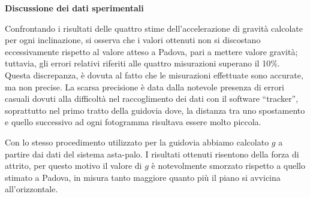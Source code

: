 \documentclass[a4paper,11pt,titlepage]{book}
\begin{document}
\newpage
\begin{center}
\begin{large}
\textbf{Discussione dei dati sperimentali}
\end{large}
\end{center}

\vspace{0.15cm}

\begin{flushleft}
Confrontando i risultati delle quattro stime dell’accelerazione di gravità calcolate per ogni inclinazione, si osserva che i valori ottenuti non si discostano eccessivamente rispetto al valore atteso a Padova, pari a mettere valore gravità; tuttavia, gli errori relativi riferiti alle quattro misurazioni superano il 10$\%$. Questa discrepanza, è dovuta al fatto che le misurazioni effettuate sono accurate, ma non precise. La scarsa precisione è data dalla notevole presenza di errori casuali dovuti alla difficoltà nel raccoglimento dei dati con il software “tracker”, soprattutto nel primo tratto della guidovia dove, la distanza tra uno spostamento e quello successivo ad ogni fotogramma risultava essere molto piccola.
\end{flushleft}



\vspace{1cm}
\begin{flushleft}
Con lo stesso procedimento utilizzato per la guidovia abbiamo calcolato $g$ a partire dai dati del sistema asta-palo. I risultati ottenuti risentono della forza di attrito, per questo motivo il valore di $g$ è notevolmente smorzato rispetto a quello stimato a Padova, in misura tanto maggiore quanto più il piano si avvicina all'orizzontale.
\end{flushleft}



\begin{figure}[h!]
\end{figure}
\end{document}
